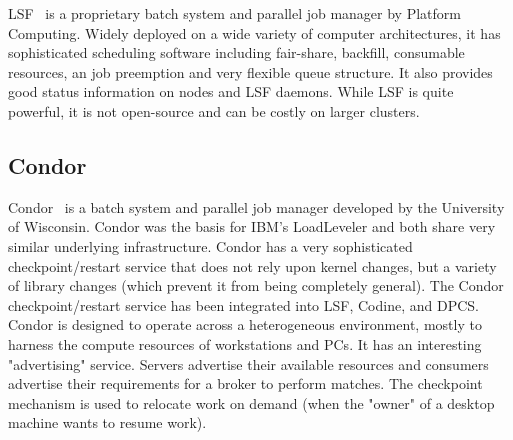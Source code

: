 LSF~\cite{LSF}
is a proprietary batch system and parallel job manager by
Platform Computing. Widely deployed on a wide variety of computer
architectures, it has sophisticated scheduling software including
fair-share, backfill, consumable resources, an job preemption and
very flexible queue structure.
It also provides good status information on nodes and LSF daemons.
While LSF is quite powerful, it is not open-source and can be costly on
larger clusters.
%


\subsection*{Condor}

Condor~\cite{Condor,Litzkow88,Basney97}
is a batch system and parallel job manager
developed by the University of Wisconsin.
Condor was the basis for IBM's LoadLeveler and both share very similar
underlying infrastructure. Condor has a very sophisticated checkpoint/restart
service that does not rely upon kernel changes, but a variety of
library changes (which prevent it from being completely general). The
Condor checkpoint/restart service has been integrated into LSF,
Codine, and DPCS. Condor is designed to operate across a
heterogeneous environment, mostly to harness the compute resources of
workstations and PCs. It has an interesting "advertising" service.
Servers advertise their available resources and consumers advertise
their requirements for a broker to perform matches. The checkpoint
mechanism is used to relocate work on demand (when the "owner" of a
desktop machine wants to resume work).

